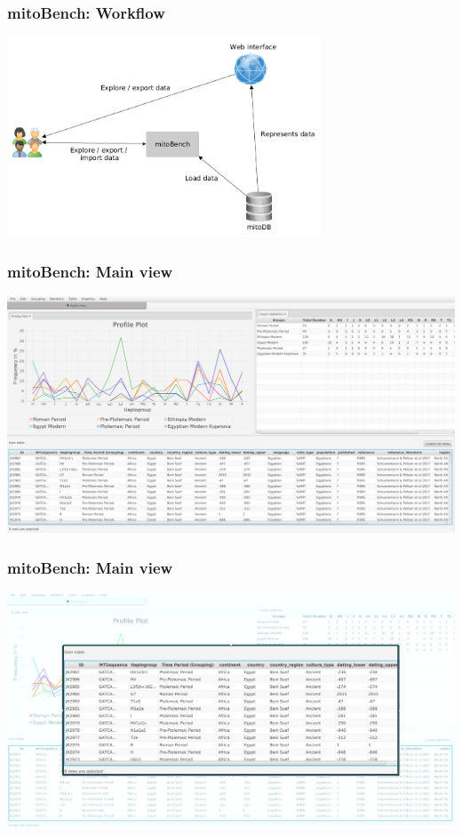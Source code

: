 \documentclass{beamer} %
\begin{document}
\begin{frame} 
\frametitle{mitoBench: Workflow}
\begin{center}
	\includegraphics[width=0.7\textwidth]{imagesBench/workflow_yed.jpg}
	\end{center}
\end{frame}

\begin{frame}
	\frametitle{mitoBench: Main view}
		\begin{center}
			\includegraphics[width=1.0\textwidth]{imagesBench/main.png}
		\end{center}
\end{frame}

\begin{frame}
	\frametitle{mitoBench: Main view}
	\begin{center}
		\includegraphics[width=1.0\textwidth]{imagesBench/main_table2.png}
	\end{center}
\end{frame}
\end{document}
